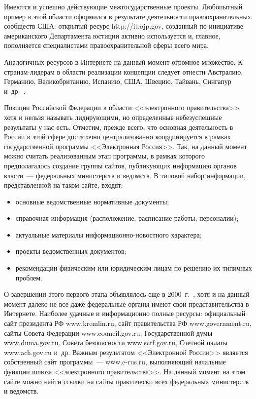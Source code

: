 \begin{multicols}{2}
Имеются и успешно действующие межгосударственные проекты. Любопытный пример в
этой области оформился в результате деятельности правоохранительных сообществ США:
открытый ресурс {\sf http://it.ojp.gov}, созданный по инициативе американского
Департамента юстиции активно используется и, главное, пополняется специалистами
правоохранительной сферы всего мира.

Аналогичных ресурсов в Интернете на данный момент огромное множество. К
странам-лидерам в области реализации концепции следует отнести Австралию,
Германию, Великобританию, Испанию, США, Швецию, Тайвань, Сингапур
и~др.~\cite{16bos}.

Позиции Российской Федерации в области <<электронного правительства>> хотя и нельзя
называть лидирующими, но определенные небезуспешные результаты у нас есть.
Отметим, прежде всего, что основная деятельность в России в этой сфере достаточно
централизованно координируется в рамках государственной программы <<Электронная
Россия>>. Так, на данный момент можно считать реализованным этап программы, в
рамках которого предполагалось создание группы сайтов, публикующих информацию
органов власти~--- федеральных министерств и ведомств. В типовой набор информации,
представленной на таком сайте, входят:
\begin{itemize}
\item основные ведомственные нормативные документы;
\item справочная информация (расположение, расписание работы, персоналии);
\item актуальные материалы информационно-но\-вост\-но\-го характера;
\item проекты ведомственных документов;
\item рекомендации физическим или юридическим лицам по решению их типичных
проблем.
\end{itemize}

О завершении этого первого этапа объявлялось еще в 2000~г.~\cite{4bos, 5bos}, хотя и
на данный момент далеко не все даже федеральные органы имеют свои представительства
в Интернете. Наиболее удачные и информационно полные ресурсы:  официальный сайт
президента РФ {\sf www.kremlin.ru}, сайт правительства РФ {\sf www.government.ru},
сайты Совета Федерации {\sf www.council.gov.ru}, Государственной думы {\sf
www.duma.gov.ru}, Совета безопас\-ности {\sf www.scrf.gov.ru}, Счетной палаты {\sf
www.ach.gov.ru} и~др. Важным результатом <<Электронной России>> является
собственный сайт программы~--- {\sf www.e-rus.ru}, выполняющий начальные функции
шлюза <<электронного правительства>>. На данный момент на этом сайте можно найти
ссылки на сайты практически всех федеральных министерств и ведомств.


\end{multicols}
